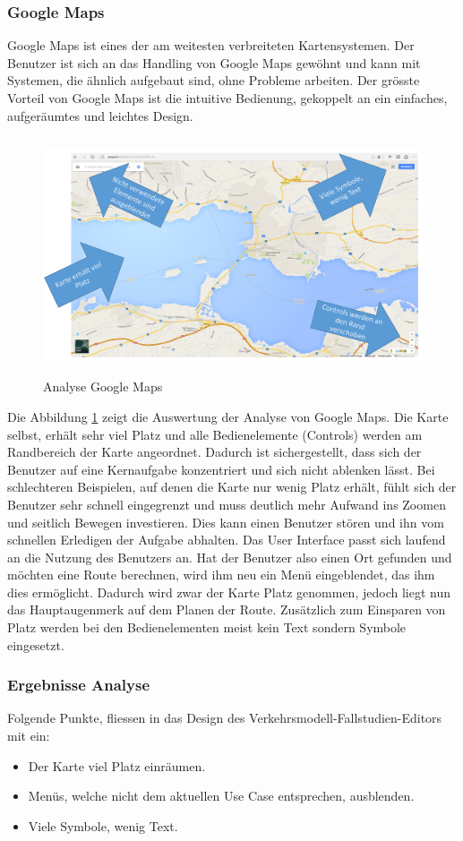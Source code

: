 \subsubsection{Google Maps}
Google Maps ist eines der am weitesten verbreiteten Kartensystemen. Der Benutzer ist sich an das Handling von Google Maps gewöhnt und kann mit Systemen, die ähnlich aufgebaut sind, ohne Probleme arbeiten. Der grösste Vorteil von Google Maps ist die intuitive Bedienung, gekoppelt an ein einfaches, aufgeräumtes und leichtes Design.
\begin{figure}[H]
\centering
\includegraphics[height=7cm]{images/AnalyseGoogle.png}
\caption{Analyse Google Maps}
\label{fig:googlemaps}
\end{figure}
\noindent
Die Abbildung \ref{fig:googlemaps}  zeigt die Auswertung der Analyse von Google Maps. Die Karte selbst, erhält sehr viel Platz und alle Bedienelemente (Controls) werden am Randbereich der Karte angeordnet. Dadurch ist sichergestellt, dass sich der Benutzer auf eine Kernaufgabe konzentriert und sich nicht ablenken lässt. Bei schlechteren Beispielen, auf denen die Karte nur wenig Platz erhält, fühlt sich der Benutzer sehr schnell eingegrenzt und muss deutlich mehr Aufwand ins Zoomen und seitlich Bewegen investieren. Dies kann einen Benutzer stören und ihn vom schnellen Erledigen der Aufgabe abhalten. Das User Interface passt sich laufend an die Nutzung des Benutzers an. Hat der Benutzer also einen Ort gefunden und möchten eine Route berechnen, wird ihm neu ein Menü eingeblendet, das ihm dies ermöglicht. Dadurch wird zwar der Karte Platz genommen, jedoch liegt nun das Hauptaugenmerk auf dem Planen der Route. Zusätzlich zum Einsparen von Platz werden bei den Bedienelementen meist kein Text sondern Symbole eingesetzt.
\subsubsection*{Ergebnisse Analyse}
Folgende Punkte, fliessen in das Design des Verkehrsmodell-Fallstudien-Editors mit ein:
\begin{itemize}
\itemsep0em
\item Der Karte viel Platz einräumen.
\item Menüs, welche nicht dem aktuellen Use Case entsprechen, ausblenden.
\item Viele Symbole, wenig Text.
\end{itemize}
\newpage
